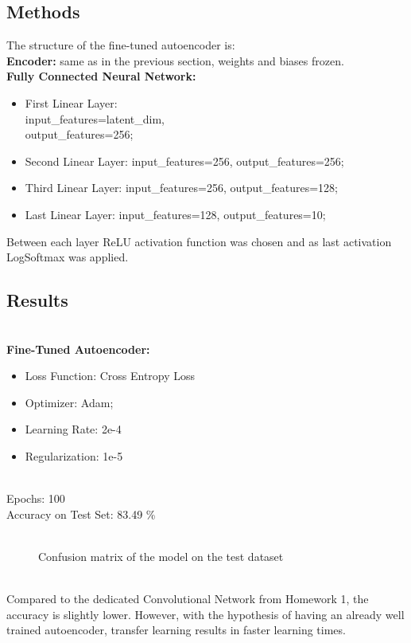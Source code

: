 \documentclass[11pt,a4paper,twocolumn]{IEEEtran}
\newcommand{\thinsepline}{\noindent\makebox[\linewidth]{\rule{7.5cm}{0.02pt}}}
\newcommand{\thinnersepline}{\noindent\makebox[\linewidth]{\rule{7.5cm}{0.01pt}}}
\begin{document}
	\subsection{\textbf{Methods}}
	The structure of the fine-tuned autoencoder is:\\
	\textbf{Encoder:} same as in the previous section, weights and biases frozen.\\
	\textbf{Fully Connected Neural Network:}
	\begin{itemize}
		\item First Linear Layer:\\ input\_features=latent\_dim,\\ output\_features=256;
		\item Second Linear Layer: input\_features=256, output\_features=256;
		\item Third Linear Layer: input\_features=256, output\_features=128;
		\item Last Linear Layer: input\_features=128, output\_features=10;
	\end{itemize}
	Between each layer ReLU activation function was chosen and as last activation LogSoftmax was applied.\bigskip\\

	\subsection{\textbf{Results}}
	\thinsepline\\
	\textbf{Fine-Tuned Autoencoder:}
	\begin{itemize}
		\item Loss Function: Cross Entropy Loss 
		\item Optimizer: Adam;
		\item Learning Rate: 2e-4
		\item Regularization: 1e-5
	\end{itemize}
	\thinnersepline\\
	Epochs: 100\\
	Accuracy on Test Set: 83.49 \% \\
	\thinsepline\vspace*{-1cm}\\
	\begin{figure}[h]
		\centering
		
		\caption{Confusion matrix of the model on the test dataset}
		\label{fig:heatmap} %
	\end{figure}\\
	Compared to the dedicated Convolutional Network from Homework 1, the accuracy is slightly lower. However, with the hypothesis of having an already well trained autoencoder, transfer learning results in faster learning times.
		
\end{document}
